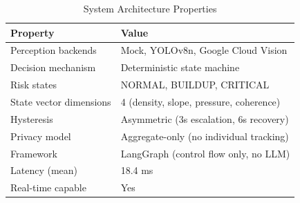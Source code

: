 \begin{table}[t]
\centering
\caption{System Architecture Properties}
\label{tab:system}
\begin{tabular}{ll}
\toprule
\textbf{Property} & \textbf{Value} \\
\midrule
        Perception backends & Mock, YOLOv8n, Google Cloud Vision \\
        Decision mechanism & Deterministic state machine \\
        Risk states & NORMAL, BUILDUP, CRITICAL \\
        State vector dimensions & 4 (density, slope, pressure, coherence) \\
        Hysteresis & Asymmetric (3s escalation, 6s recovery) \\
        Privacy model & Aggregate-only (no individual tracking) \\
        Framework & LangGraph (control flow only, no LLM) \\
        Latency (mean) & 18.4 ms \\
        Real-time capable & Yes \\
\bottomrule
\end{tabular}
\end{table}
